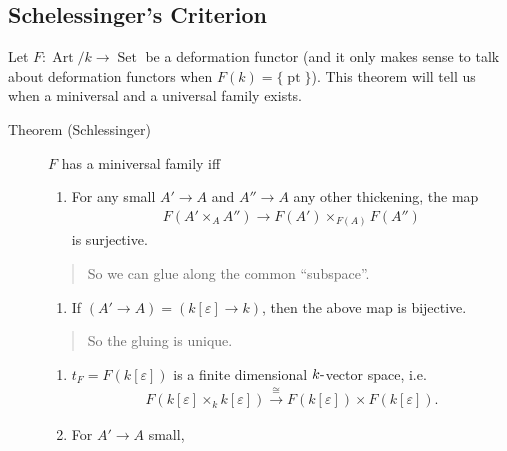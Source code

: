 \hypertarget{schelessingers-criterion}{%
\subsection{Schelessinger's Criterion}\label{schelessingers-criterion}}

Let \(F: \operatorname{Art}/k \to {\operatorname{Set}}\) be a
deformation functor (and it only makes sense to talk about deformation
functors when \(F(k) = {\{\operatorname{pt}\}}\)). This theorem will
tell us when a miniversal and a universal family exists.

\begin{description}
\item[Theorem (Schlessinger)]
\(F\) has a miniversal family iff

\begin{enumerate}
\def\labelenumi{\arabic{enumi}.}
\tightlist
\item
  For any small \(A' \to A\) and \(A'' \to A\) any other thickening, the
  map
  \begin{align*}     F(A' \times_A A'') \to F(A') \times_{F(A)} F(A'')     \end{align*}
  is surjective.
\end{enumerate}

\begin{quote}
So we can glue along the common ``subspace''.
\end{quote}

\begin{enumerate}
\def\labelenumi{\arabic{enumi}.}
\setcounter{enumi}{1}
\tightlist
\item
  If \((A' \to A) = (k[\varepsilon] \to k)\), then the above map is
  bijective.
\end{enumerate}

\begin{quote}
So the gluing is unique.
\end{quote}

\begin{enumerate}
\def\labelenumi{\arabic{enumi}.}
\setcounter{enumi}{2}
\item
  \(t_F = F(k[\varepsilon])\) is a finite dimensional
  \(k{\hbox{-}}\)vector space,
  i.e.~\begin{align*}     F(k[\varepsilon] \times_k k[\varepsilon]) \xrightarrow{\cong} F(k[\varepsilon]) \times F(k[\varepsilon])     .\end{align*}
\item
  For \(A' \to A\) small,


\end{enumerate}
\end{description}

